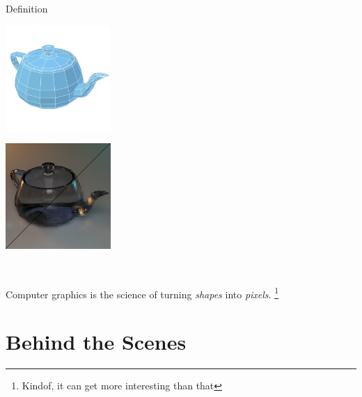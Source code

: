 \documentclass{lug}
\newcommand{\pmidg}[1]{\parbox{\widthof{#1}}{#1}}
\begin{document}
\begin{frame}{Definition}
\begin{center}
    \pmidg{\includegraphics[width=4cm]{graphics/teapot_mesh}} \scalebox{2}{$\rightarrow$} \pmidg{\includegraphics[width=4cm]{graphics/teapot_rt_pix}} \\
    
    \bigskip

    Computer graphics is the science of turning \textit{shapes} into \textit{pixels}. \footnote{Kindof, it can get more interesting than that}
\end{center}
\end{frame}

\section{Behind the Scenes}
\end{document}
